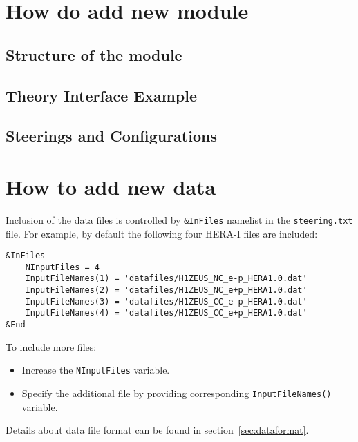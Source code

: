 \documentclass[11pt,a4paper]{article}
\begin{document}
\section{How do add new module}
\subsection{Structure of the module}
\subsection{Theory Interface Example}
\subsection{Steerings and Configurations}
\section{How to add new data}
Inclusion of the data files is controlled by {\tt \&InFiles} namelist in the 
{\tt steering.txt} file. For example, by default the following four HERA-I
    files are included:
\begin{verbatim}
&InFiles
    NInputFiles = 4
    InputFileNames(1) = 'datafiles/H1ZEUS_NC_e-p_HERA1.0.dat'
    InputFileNames(2) = 'datafiles/H1ZEUS_NC_e+p_HERA1.0.dat'
    InputFileNames(3) = 'datafiles/H1ZEUS_CC_e-p_HERA1.0.dat'
    InputFileNames(4) = 'datafiles/H1ZEUS_CC_e+p_HERA1.0.dat'
&End
\end{verbatim}

To include more files:
\begin{itemize}
 \item  Increase the {\tt NInputFiles} variable.
 \item  Specify the additional file by providing corresponding
  {\tt InputFileNames()} variable.
\end{itemize}
Details about data file format can be found in section~\ref{sec:dataformat}.
\end{document}
